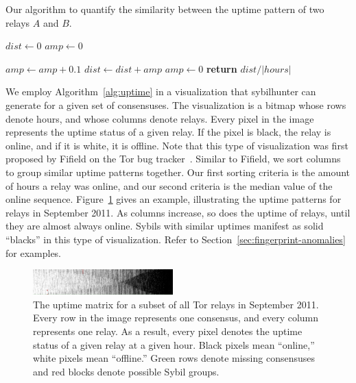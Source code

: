\begin{algorithm}[t]
\caption{Our algorithm to quantify the similarity between the uptime pattern
of two relays $A$ and $B$.}
\label{alg:uptime}
\begin{algorithmic}[1]
    \State $dist \gets 0$
    \State $amp \gets 0$

                \State $amp \gets amp + 0.1$
            \EndIf
        \State $dist \gets dist + amp$
        \Else
            \State $amp \gets 0$
        \EndIf
    \EndFor
    \State \textbf{return} $dist / \lvert hours \rvert$
\EndFunction
\end{algorithmic}
\end{algorithm}

We employ Algorithm~\ref{alg:uptime} in a visualization that sybilhunter can
generate for a given set of consensuses.  The visualization is a bitmap whose
rows denote hours, and whose columns denote relays.  Every pixel in the image
represents the uptime status of a given relay.  If the pixel is black, the relay
is online, and if it is white, it is offline.  Note that this type of
visualization was first proposed by Fifield on the Tor bug
tracker~\cite{Fifield2014a}.  Similar to Fifield, we sort columns to group
similar uptime patterns together.  Our first sorting criteria is the amount of
hours a relay was online, and our second criteria is the median value of the
online sequence.  Figure~\ref{fig:uptime-matrix} gives an example, illustrating
the uptime patterns for relays in September 2011.  As columns increase, so does
the uptime of relays, until they are almost always online.  Sybils with similar
uptimes manifest as solid ``blacks'' in this type of visualization.  Refer to
Section~\ref{sec:fingerprint-anomalies} for examples.

\begin{figure}[t]
	\centering
	\includegraphics[width=0.48\textwidth]{diagrams/2011-09-uptimes-truncated.jpg}
	\caption{The uptime matrix for a subset of all Tor relays in September 2011.
		Every row in the image represents one consensus, and every column
		represents one relay.  As a result, every pixel denotes the uptime
		status of a given relay at a given hour.  Black pixels mean ``online,''
		white pixels mean ``offline.''  Green rows denote missing consensuses
		and red blocks denote possible Sybil groups.}
	\label{fig:uptime-matrix}
\end{figure}

